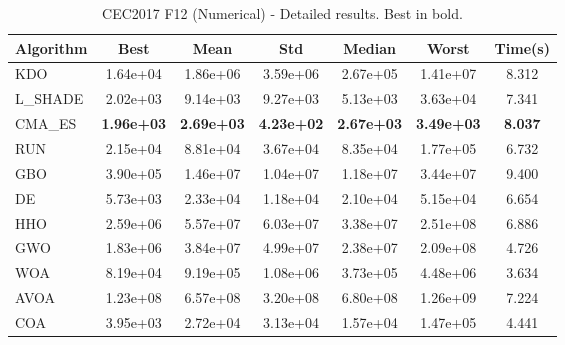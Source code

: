 \begin{table}[H]
\centering\small
\caption{CEC2017 F12 (Numerical) - Detailed results. Best in bold.}
\label{tab:cec2017_F12}
\begin{tabular}{lcccccc}
\toprule
\textbf{Algorithm} & \textbf{Best} & \textbf{Mean} & \textbf{Std} & \textbf{Median} & \textbf{Worst} & \textbf{Time(s)} \\
\midrule
KDO & 1.64e+04 & 1.86e+06 & 3.59e+06 & 2.67e+05 & 1.41e+07 & 8.312 \\
L_SHADE & 2.02e+03 & 9.14e+03 & 9.27e+03 & 5.13e+03 & 3.63e+04 & 7.341 \\
CMA_ES & \textbf{1.96e+03} & \textbf{2.69e+03} & \textbf{4.23e+02} & \textbf{2.67e+03} & \textbf{3.49e+03} & \textbf{8.037} \\
RUN & 2.15e+04 & 8.81e+04 & 3.67e+04 & 8.35e+04 & 1.77e+05 & 6.732 \\
GBO & 3.90e+05 & 1.46e+07 & 1.04e+07 & 1.18e+07 & 3.44e+07 & 9.400 \\
DE & 5.73e+03 & 2.33e+04 & 1.18e+04 & 2.10e+04 & 5.15e+04 & 6.654 \\
HHO & 2.59e+06 & 5.57e+07 & 6.03e+07 & 3.38e+07 & 2.51e+08 & 6.886 \\
GWO & 1.83e+06 & 3.84e+07 & 4.99e+07 & 2.38e+07 & 2.09e+08 & 4.726 \\
WOA & 8.19e+04 & 9.19e+05 & 1.08e+06 & 3.73e+05 & 4.48e+06 & 3.634 \\
AVOA & 1.23e+08 & 6.57e+08 & 3.20e+08 & 6.80e+08 & 1.26e+09 & 7.224 \\
COA & 3.95e+03 & 2.72e+04 & 3.13e+04 & 1.57e+04 & 1.47e+05 & 4.441 \\
\bottomrule
\end{tabular}
\end{table}
